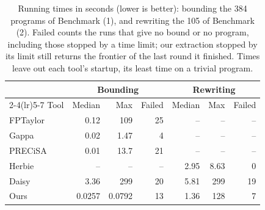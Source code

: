 \begin{table}[H] \centering \small
\caption{Running times in seconds (lower is better): bounding the 384 programs of Benchmark (1), and rewriting the 105 of Benchmark (2). Failed counts the runs that give no bound or no program, including those stopped by a time limit; our extraction stopped by its limit still returns the frontier of the last round it finished. Times leave out each tool's startup, its least time on a trivial program.}\label{tab:runtime}
\begin{tabular}{lrrrrrr}
\toprule
& \multicolumn{3}{c}{Bounding} & \multicolumn{3}{c}{Rewriting} \\
\cmidrule(lr){2-4}\cmidrule(lr){5-7}
Tool & Median & Max & Failed & Median & Max & Failed \\
\midrule
FPTaylor & 0.12 & 109 & 25 & -- & -- & -- \\
Gappa & 0.02 & 1.47 & 4 & -- & -- & -- \\
PRECiSA & 0.01 & 13.7 & 21 & -- & -- & -- \\
Herbie & -- & -- & -- & 2.95 & 8.63 & 0 \\
Daisy & 3.36 & 299 & 20 & 5.81 & 299 & 19 \\
Ours & 0.0257 & 0.0792 & 13 & 1.36 & 128 & 7 \\
\bottomrule
\end{tabular}
\end{table}
